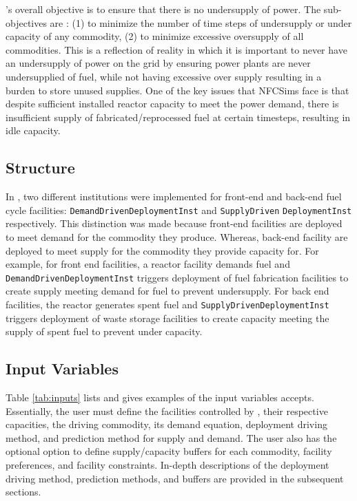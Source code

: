 \deploy's overall objective is to ensure that there is no 
undersupply of power. 
The sub-objectives are : (1) to minimize the number of time 
steps of undersupply or under capacity of any 
commodity, (2) to minimize excessive oversupply of all commodities.
This is a reflection of reality in which it is important to 
never have an undersupply of power on the grid by ensuring power 
plants are never undersupplied of fuel, while not 
having excessive over supply resulting in a burden to store unused 
supplies. 
One of the key issues that \gls{NFCSim}s face is that despite
sufficient installed reactor capacity to meet the power 
demand, there is insufficient supply of fabricated/reprocessed 
fuel at certain timesteps, resulting in idle capacity.  

\subsection{Structure}
In \deploy, two different institutions were implemented for 
front-end and back-end fuel cycle facilities: 
\texttt{DemandDrivenDeploymentInst} and 
\texttt{SupplyDriven} 
\noindent
\texttt{DeploymentInst} respectively. 
This distinction was made because front-end facilities 
are deployed to meet demand for the commodity they produce. 
Whereas, back-end facility are deployed to meet supply for the 
commodity they provide capacity for. 
For example, for front end facilities, a reactor facility 
demands fuel and \texttt{DemandDrivenDeploymentInst} 
triggers deployment of fuel fabrication facilities to create 
supply meeting demand for fuel to prevent undersupply. 
For back end facilities, the reactor generates spent fuel and 
\texttt{SupplyDrivenDeploymentInst} triggers deployment of 
waste storage facilities to create capacity meeting the supply 
of spent fuel to prevent under capacity. 

\subsection{Input Variables}
Table \ref{tab:inputs} lists and gives examples of the input 
variables \deploy accepts. 
Essentially, the user must define the facilities controlled by 
\deploy, their respective capacities, the driving commodity, 
its demand equation, deployment driving method, and prediction method 
for supply and demand. 
The user also has the optional option to define supply/capacity buffers 
for each commodity, facility preferences, and facility constraints. 
In-depth descriptions of the deployment driving method, prediction 
methods, and buffers are provided in the subsequent sections. 


